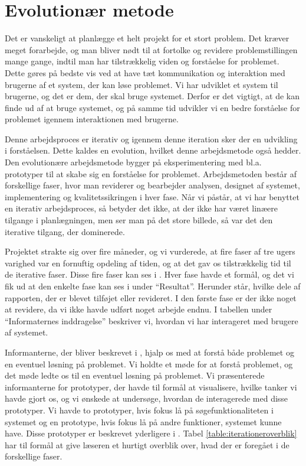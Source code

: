 \section{Evolutionær metode}
\label{sec:evolution}

Det er vanskeligt at planlægge et helt projekt for et stort problem. Det kræver meget forarbejde, og man bliver nødt til at fortolke og revidere problemstillingen mange gange, indtil man har tilstrækkelig viden og forståelse for problemet. Dette gøres på bedste vis ved at have tæt kommunikation og interaktion med brugerne af et system, der kan løse problemet. Vi har udviklet et system til brugerne, og det er dem, der skal bruge systemet. Derfor er det vigtigt, at de kan finde ud af at bruge systemet, og på samme tid udvikler vi en bedre forståelse for problemet igennem interaktionen med brugerne. 

Denne arbejdsproces er iterativ og igennem denne iteration sker der en udvikling i forståelsen. Dette kaldes en evolution, hvilket denne arbejdsmetode også hedder. Den evolutionære arbejdsmetode bygger på eksperimentering med bl.a. prototyper til at skabe sig en forståelse for problemet. Arbejdsmetoden består af forskellige faser, hvor man reviderer og bearbejder analysen, designet af systemet, implementering og kvalitetssikringen i hver fase. \cite{cic} Når vi påstår, at vi har benyttet en iterativ arbejdsproces, så betyder det ikke, at der ikke har været linæere tilgange i planlægningen, men ser man på det store billede, så var det den iterative tilgang, der dominerede.

Projektet strakte sig over fire måneder, og vi vurderede, at fire faser af tre ugers varighed var en fornuftig opdeling af tiden, og at det gav os tilstrækkelig tid til de iterative faser. Disse fire faser kan ses i . Hver fase havde et formål, og det vi fik ud at den enkelte fase kan ses i  under ``Resultat''. Herunder står, hvilke dele af rapporten, der er blevet tilføjet eller revideret. I den første fase er der ikke noget at revidere, da vi ikke havde udført noget arbejde endnu. I tabellen under ``Informaternes inddragelse'' beskriver vi, hvordan vi har interageret med brugere af systemet.

Informanterne, der bliver beskrevet i , hjalp os med at forstå både problemet og en eventuel løsning på problemet. Vi holdte et møde for at forstå problemet, og det møde ledte os til en eventuel løsning på problemet. Vi præsenterede informanterne for prototyper, der havde til formål at visualisere, hvilke tanker vi havde gjort os, og vi ønskede at undersøge, hvordan de interagerede med disse prototyper. Vi havde to prototyper, hvis fokus lå på søgefunktionaliteten i systemet og en prototype, hvis fokus lå på andre funktioner, systemet kunne have. Disse prototyper er beskrevet yderligere i . Tabel \ref{table:iterationeroverblik} har til formål at give læseren et hurtigt overblik over, hvad der er foregået i de forskellige faser.



